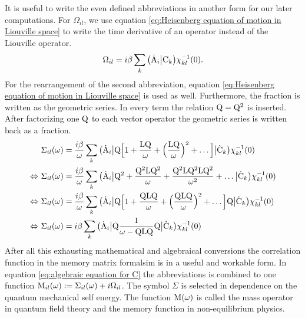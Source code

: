 It is useful to write the even defined abbreviations in another form for our later computations.
For $\Omega_{il}$, we use equation \eqref{eq:Heisenberg equation of motion in Liouville space} to write the time derivative of an operator instead of the Liouville operator.
%
\begin{align}
	\Omega_{il} = i \beta \sum\limits_{k} \big({\dot{\mathrm{A}}_{i}}\big|{\mathrm{C}_{k}}\big) \chi_{kl}^{-1}(0).
	\label{eq:Omega}
\end{align}
%
For the rearrangement of the second abbreviation, equation \eqref{eq:Heisenberg equation of motion in Liouville space} is used as well.
Furthermore, the fraction is written as the geometric series.
In every term the relation $\mathrm{Q} = \mathrm{Q}^{2}$ is inserted.
After factorizing one $\mathrm{Q}$ to each vector operator the geometric series is written back as a fraction.
%
\begin{align}
	&\Sigma_{il}(\omega) = \frac{i \beta}{\omega} \sum\limits_{k} \big({\dot{\mathrm{A}}_{i}}\big| \mathrm{Q} \Big[1 + \frac{\mathrm{LQ}}{\omega} + \Big(\frac{\mathrm{LQ}}{\omega}\Big)^{2} + \dots\Big] \big|{\dot{\mathrm{C}}_{k}}\big) \chi_{kl}^{-1}(0)
	\notag \\
	\Leftrightarrow\ &\Sigma_{il}(\omega) = \frac{i \beta}{\omega} \sum\limits_{k} \big({\dot{\mathrm{A}}_{i}}\big| \mathrm{Q}^{2} + \frac{\mathrm{Q^{2}LQ^{2}}}{\omega} + \frac{\mathrm{Q^{2}LQ^{2}LQ^{2}}}{\omega^{2}} + \dots\big|{\dot{\mathrm{C}}_{k}}\big) \chi_{kl}^{-1}(0)
	\notag \\
	\Leftrightarrow\ &\Sigma_{il}(\omega) = \frac{i \beta}{\omega} \sum\limits_{k} \big({\dot{\mathrm{A}}_{i}}\big| \mathrm{Q} \Big[1 + \frac{\mathrm{QLQ}}{\omega} + \Big(\frac{\mathrm{QLQ}}{\omega}\Big)^{2} + \dots\Big] \mathrm{Q} \big|{\dot{\mathrm{C}}_{k}}\big) \chi_{kl}^{-1}(0)
	\notag \\
	\Leftrightarrow\ &\Sigma_{il}(\omega) = i \beta \sum\limits_{k} \big({\dot{\mathrm{A}}_{i}}\big| \mathrm{Q} \frac{1}{\omega - \mathrm{QLQ}} \mathrm{Q} \big|{\dot{\mathrm{C}}_{k}}\big) \chi_{kl}^{-1}(0)
	\label{eq:Sigma(z)}
\end{align} 
%
After all this exhausting mathematical and algebraical conversions the correlation function in the memory matrix formalsim is in a useful and workable form.
In equation \eqref{eq:algebraic equation for C} the abbreviations is combined to one function $\mathrm{M}_{il}(\omega) := \Sigma_{il}(\omega) +i \Omega_{il}$.
The symbol $\Sigma$ is selected in dependence on the quantum mechanical self energy.
The function $\mathrm{M}(\omega)$ is called the mass operator in quantum field theory and the memory function in non-equilibrium physics.

